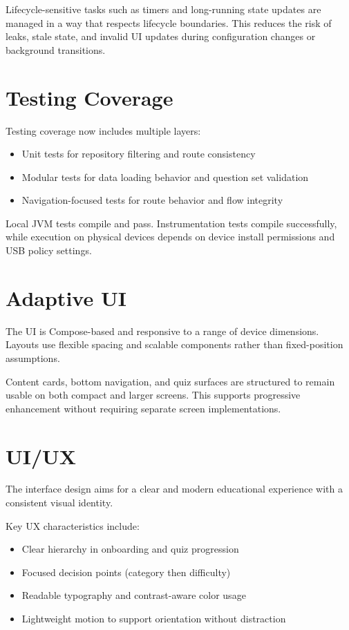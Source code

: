\documentclass[12pt,a4paper]{article}
\begin{document}
Lifecycle-sensitive tasks such as timers and long-running state updates are managed in a way that respects lifecycle boundaries. This reduces the risk of leaks, stale state, and invalid UI updates during configuration changes or background transitions.

\section{Testing Coverage}
Testing coverage now includes multiple layers:
\begin{itemize}
    \item Unit tests for repository filtering and route consistency
    \item Modular tests for data loading behavior and question set validation
    \item Navigation-focused tests for route behavior and flow integrity
\end{itemize}

Local JVM tests compile and pass. Instrumentation tests compile successfully, while execution on physical devices depends on device install permissions and USB policy settings.

\section{Adaptive UI}
The UI is Compose-based and responsive to a range of device dimensions. Layouts use flexible spacing and scalable components rather than fixed-position assumptions.

Content cards, bottom navigation, and quiz surfaces are structured to remain usable on both compact and larger screens. This supports progressive enhancement without requiring separate screen implementations.

\section{UI/UX}
The interface design aims for a clear and modern educational experience with a consistent visual identity.

Key UX characteristics include:
\begin{itemize}
    \item Clear hierarchy in onboarding and quiz progression
    \item Focused decision points (category then difficulty)
    \item Readable typography and contrast-aware color usage
    \item Lightweight motion to support orientation without distraction
\end{itemize}
\end{document}
